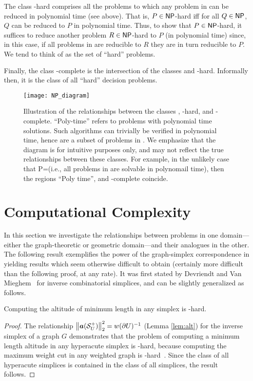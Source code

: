 The class \NP-hard comprises all the problems to  which  any problem in \NP can be reduced in polynomial time (see above). That is, $P\in{\normalfont\textsf{NP}}$-hard iff for all  $Q\in{\normalfont\textsf{NP}}$,  $Q$ can be  reduced to $P$ in polynomial time. Thus,  to show that $P\in{\normalfont\textsf{NP}}$-hard, it suffices to reduce another problem $R\in{\normalfont\textsf{NP}}$-hard to  $P$ (in polynomial time) since,  in this  case, if all problems in \NP are  reducible  to  $R$  they are in turn  reducible  to  $P$. We  tend to think of \NP as the set of ``hard'' problems. 

Finally,  the class \NP-complete is the intersection of the classes \NP and  \NP-hard. Informally then, it is  the  class of all ``hard'' decision problems. 

\begin{figure}
	\centering
	\texttt{[image: NP\_diagram]}
	\caption{Illustration of the relationships between the  classes \NP,  \NP-hard, and \NP-complete. ``Poly-time'' refers to problems with polynomial time solutions. Such algorithms can trivially be verified  in polynomial time, hence  are a  subset of problems in \NP. We emphasize that the diagram is  for intuitive purposes only,  and may not reflect the true relationships between these classes. For example, in  the unlikely  case that \textsf{P}=\NP (i.e., all problems in  \NP are solvable in polynomail time), then the regions ``Poly time'', \NP and \NP-complete coincide.}
\end{figure}



\section{Computational Complexity}
\label{sec:algorithmics_complexity}

In this section we investigate the relationships between problems in one domain---either the graph-theoretic or geometric domain---and their analogues in the other. The following result exemplifies the power of the graph-simplex correspondence in yielding results which seem otherwise difficult to obtain (certainly more difficult than the following proof, at any rate).  
It was first stated by Devriendt and Van Mieghem~\cite{devriendt2018simplex} for inverse combinatorial  simplices, and can be slightly generalized as follows.  

\begin{lemma}
	\label{lem:altitude_hard}
	Computing the altitude of minimum length in any simplex is \NP-hard. 
\end{lemma}
\begin{proof}
	The relationship $\norm{\vb*{a}(\mathcal{S}^+_U)}_2^2 = w(\partial U)^{-1}$ (Lemma \ref{lem:alt}) for the inverse simplex of a graph $G$ demonstrates that the problem of computing a minimum length altitude in any hyperacute simplex is \NP-hard, because computing the  maximum weight cut in any weighted graph is \NP-hard~\cite{karp1972reducibility}.  Since the  class  of all hyperacute simplices is contained in the class of all simplices, the result follows.  
\end{proof}

